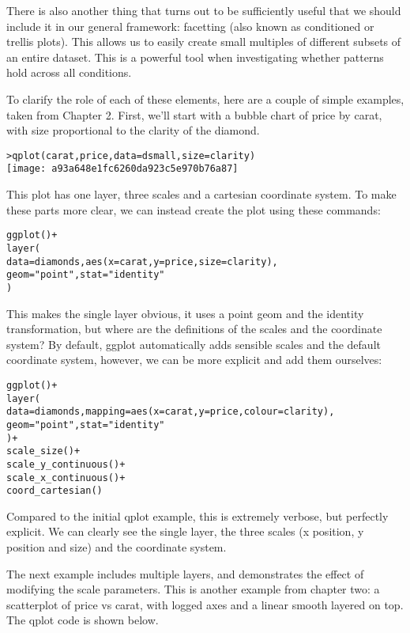 There is also another thing that turns out to be sufficiently useful that we should include it in our general framework: facetting (also known as conditioned or trellis plots). This allows us to easily create small multiples of different subsets of an entire dataset. This is a powerful tool when investigating whether patterns hold across all conditions.

To clarify the role of each of these elements, here are a couple of simple examples, taken from Chapter 2.  First, we'll start with a bubble chart of price by carat, with size proportional to the clarity of the diamond.

\begin{alltt}
> qplot(carat, price, data = dsmall, size = clarity)
\texttt{[image: a93a648e1fc6260da923c5e970b76a87]}

\end{alltt}

This plot has one layer, three scales and a cartesian coordinate system.  To make these parts more clear, we can instead create the plot using these commands:

\begin{alltt}
ggplot() + 
layer(
  data = diamonds, aes(x = carat, y = price, size = clarity),
  geom = "point", stat = "identity"
)
\end{alltt}

This makes the single layer obvious, it uses a point geom and the identity transformation, but where are the definitions of the scales and the coordinate system?  By default, ggplot automatically adds sensible scales and the default coordinate system, however, we can be more explicit and add them ourselves:

\begin{alltt}
ggplot() + 
layer(
  data = diamonds, mapping = aes(x = carat, y = price, colour = clarity),
  geom = "point", stat = "identity"
) + 
scale_size() + 
scale_y_continuous() + 
scale_x_continuous() + 
coord_cartesian()
\end{alltt}

Compared to the initial qplot example, this is extremely verbose, but perfectly explicit.  We  can clearly see the single layer, the three scales (x position, y position and size) and the coordinate system.  

The next example includes multiple layers, and demonstrates the effect of modifying the scale parameters.  This is another example from chapter two: a scatterplot of price vs carat, with logged axes and a linear smooth layered on top.  The qplot code is shown below.

